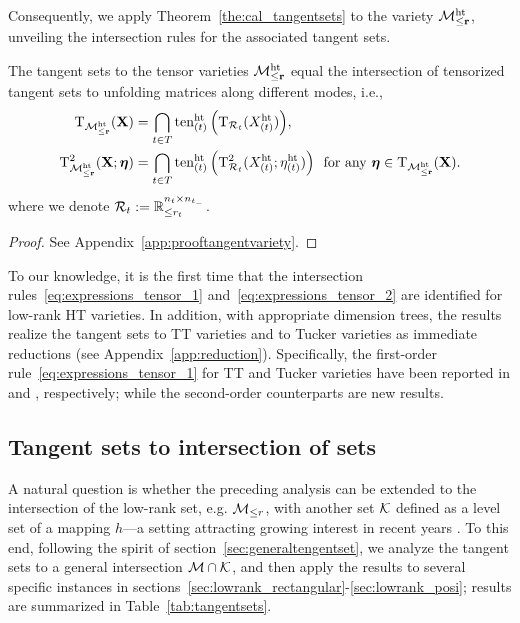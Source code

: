 Consequently, we apply Theorem~\ref{the:cal_tangentsets} to the variety $\mathcal{M}_{\le \mathbf{r}}^{\mathrm{ht}}$, unveiling the intersection rules for the associated tangent sets.


\begin{proposition}\label{pro:tangenttovarieties}
    The tangent sets to the tensor varieties $\mathcal{M}_{\le \mathbf{r}}^{\mathrm{ht}}$ equal the intersection of tensorized tangent sets to unfolding matrices along different modes, i.e.,
    \begin{align}
        \mathrm{T}_{\mathcal{M}_{\le \mathbf{r}}^{\mathrm{ht}}}(\mathbf{X}) &= \bigcap_{t\in T}{\mathrm{ten}_{(t)}^{\mathrm{ht}}\left( {\mathrm{T}_{\mathcal{R}_t}(X^{\mathrm{ht}}_{(t)})} \right)},    \label{eq:expressions_tensor_1}
        \\
        \mathrm{T}^2_{\mathcal{M}_{\le \mathbf{r}}^{\mathrm{ht}}}(\mathbf{X};\bm{\eta}) &= \bigcap_{t\in T}{\mathrm{ten}_{(t)}^{\mathrm{ht}}\left( {\mathrm{T}^2_{\mathcal{R}_t}(X^{\mathrm{ht}}_{(t)};\eta^{\mathrm{ht}}_{(t)})} \right)} \ \ \text{for any}\ \bm{\eta}\in \mathrm{T}_{\mathcal{M}_{\le \mathbf{r}}^{\mathrm{ht}}}(\mathbf{X}).    \label{eq:expressions_tensor_2}
    \end{align}
    where we denote $\mathcal{R}_t:=\mathbb{R}_{\le r_t}^{n_t\times n_{t_-}}$.
\end{proposition}
\begin{proof}
    See Appendix~\ref{app:prooftangentvariety}.
\end{proof}

To our knowledge, it is the first time that the intersection rules~\eqref{eq:expressions_tensor_1} and~\eqref{eq:expressions_tensor_2} are identified for low-rank HT varieties. In addition, with appropriate dimension trees, the results realize the tangent sets to TT varieties and to Tucker varieties as immediate reductions (see Appendix~\ref{app:reduction}). Specifically, the first-order rule~\eqref{eq:expressions_tensor_1} for TT and Tucker varieties have been reported in \cite[Corollary 2.9]{kutschan2018tangentTT} and \cite[Corollary 1]{gao2025lowranktucker}, respectively; while the second-order counterparts are new results.

\subsection{Tangent sets to intersection of sets}\label{sec:McapH}
A natural question is whether the preceding analysis can be extended to the intersection of the low-rank set, e.g. $\mathcal{M}_{\le r}$, with another set $\mathcal{K}$ defined as a level set of a mapping $h$---a setting attracting growing interest in recent years \cite{cason2013iterative,li2020jotaspectral,li2023normalboundedaffine,yang2025spacedecouple}. To this end, following the spirit of section~\ref{sec:generaltengentset}, we analyze the tangent sets to a general intersection $\mathcal{M}\cap\mathcal{K}$, and then apply the results to several specific instances in sections~\ref{sec:lowrank_rectangular}-\ref{sec:lowrank_posi}; results are summarized in Table~\ref{tab:tangentsets}.

